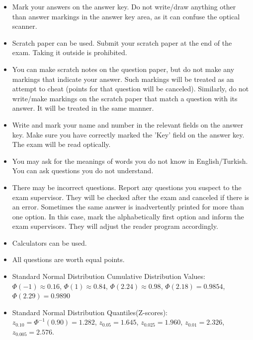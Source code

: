 \documentclass[twocolumn]{exam}
\begin{document}
\begin{itemize}
    \item Mark your answers on the answer key. Do not write/draw anything other than answer markings in the answer key area, as it can confuse the optical scanner.
    \item Scratch paper can be used. Submit your scratch paper at the end of the exam. Taking it outside is prohibited.
    \item You can make scratch notes on the question paper, but do not make any markings that indicate your answer. Such markings will be treated as an attempt to cheat (points for that question will be canceled). Similarly, do not write/make markings on the scratch paper that match a question with its answer. It will be treated in the same manner.
    \item Write and mark your name and number in the relevant fields on the answer key. Make sure you have correctly marked the 'Key' field on the answer key. The exam will be read optically.
    \item You may ask for the meanings of words you do not know in English/Turkish. You can ask questions you do not understand.
    \item There may be incorrect questions. Report any questions you suspect to the exam supervisor. They will be checked after the exam and canceled if there is an error. Sometimes the same answer is inadvertently printed for more than one option. In this case, mark the alphabetically first option and inform the exam supervisors. They will adjust the reader program accordingly.
    \item Calculators can be used.
    \item All questions are worth equal points.
    \item Standard Normal Distribution Cumulative Distribution Values: $\Phi(-1) \approx 0.16$, $\Phi(1) \approx 0.84$, $\Phi(2.24) \approx 0.98$, $\Phi(2.18) = 0.9854$, $\Phi(2.29) = 0.9890$
    \item Standard Normal Distribution Quantiles(Z-scores): $z_{0.10} = \Phi^{-1} (0.90) = 1.282$, $z_{0.05} = 1.645$,
    $z_{0.025} = 1.960$, $z_{0.01} = 2.326$, $z_{0.005} = 2.576$.
    \end{itemize}
    
\end{document}
